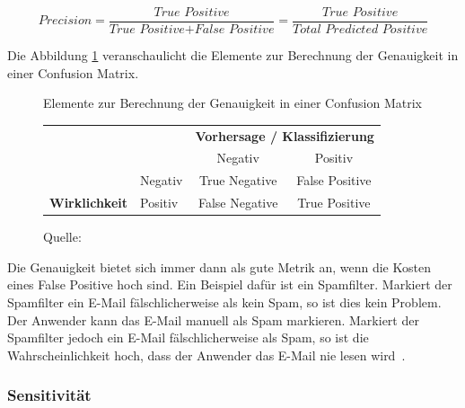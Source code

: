 \nopagebreak
$$\textit{Precision} = \frac{\textit{True Positive}}{\textit{True Positive} + \textit{False Positive}} = \frac{\textit{True Positive}}{\textit{Total Predicted Positive}}$$
\vspace*{0.2cm}

Die Abbildung \ref{cm-precision} veranschaulicht die Elemente zur Berechnung der Genauigkeit in einer Confusion Matrix.

\begin{figure}[h!]
    \centering
    \captionsetup{width=.9\linewidth}
    \caption{Elemente zur Berechnung der Genauigkeit in einer Confusion Matrix}
    \label{cm-precision}
    \def\arraystretch{1.5}
    \begin{tabular}{llcc}
        \multicolumn{2}{l}{}                                                                        & \multicolumn{2}{c}{\textbf{Vorhersage / Klassifizierung}}                                         \\ \cline{3-4} 
        \multicolumn{1}{c}{\textbf{}}                                & \multicolumn{1}{l|}{}        & \multicolumn{1}{c|}{Negativ}        & \multicolumn{1}{c|}{\cellcolor[HTML]{B5D0EE}Positiv}        \\ \cline{2-4} 
        \multicolumn{1}{l|}{}                                        & \multicolumn{1}{l|}{Negativ} & \multicolumn{1}{c|}{True Negative}  & \multicolumn{1}{c|}{\cellcolor[HTML]{B5D0EE}False Positive} \\ \cline{2-4} 
        \multicolumn{1}{l|}{\multirow{-2}{*}{\textbf{Wirklichkeit}}} & \multicolumn{1}{l|}{Positiv} & \multicolumn{1}{c|}{False Negative} & \multicolumn{1}{c|}{\cellcolor[HTML]{B5D0EE}True Positive}  \\ \cline{2-4} 
    \end{tabular}
    \vspace*{0.3cm}
    \caption*{Quelle: \textcite{TDSAccuracy}}
\end{figure}

Die Genauigkeit bietet sich immer dann als gute Metrik an, wenn die Kosten eines False Positive hoch sind. Ein Beispiel dafür ist ein Spamfilter. Markiert der Spamfilter ein E-Mail fälschlicherweise als kein Spam, so ist dies kein Problem. Der Anwender kann das E-Mail manuell als Spam markieren. Markiert der Spamfilter jedoch ein E-Mail fälschlicherweise als Spam, so ist die Wahrscheinlichkeit hoch, dass der Anwender das E-Mail nie lesen wird~\autocite{TDSAccuracy}.

\subsubsection{Sensitivität}


